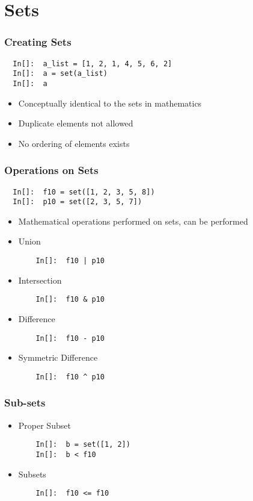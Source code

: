 \section{Sets}

\begin{frame}[fragile]
  \frametitle{Creating Sets}
  \begin{lstlisting}
  In[]:  a_list = [1, 2, 1, 4, 5, 6, 2]
  In[]:  a = set(a_list)
  In[]:  a
  \end{lstlisting}
  \begin{itemize}
  \item Conceptually identical to the sets in mathematics
  \item Duplicate elements not allowed
  \item No ordering of elements exists
  \end{itemize}
\end{frame}

\begin{frame}[fragile]
  \frametitle{Operations on Sets}
  \begin{lstlisting}
  In[]:  f10 = set([1, 2, 3, 5, 8])
  In[]:  p10 = set([2, 3, 5, 7])
  \end{lstlisting}
  \begin{itemize}
  \item Mathematical operations performed on sets, can be performed
  \end{itemize}
  \begin{itemize}
  \item Union
    \begin{lstlisting}
    In[]:  f10 | p10
    \end{lstlisting}
  \item Intersection
    \begin{lstlisting}
    In[]:  f10 & p10
    \end{lstlisting}
  \item Difference
    \begin{lstlisting}
    In[]:  f10 - p10
    \end{lstlisting}
  \item Symmetric Difference
    \begin{lstlisting}
    In[]:  f10 ^ p10
    \end{lstlisting}
  \end{itemize}
\end{frame}

\begin{frame}[fragile]
  \frametitle{Sub-sets}
  \begin{itemize}
  \item Proper Subset
    \begin{lstlisting}
    In[]:  b = set([1, 2])
    In[]:  b < f10
    \end{lstlisting}
  \item Subsets
    \begin{lstlisting}
    In[]:  f10 <= f10
    \end{lstlisting}
  \end{itemize}
\end{frame}

